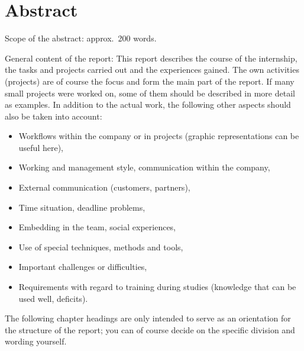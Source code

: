 \documentclass[type=internship,theme=default,language=english,titlelanguage=english,smartquotes=true,aiusage=detailed]{hgbthesis}
\begin{document}
\begin{aiusage}
\end{aiusage}

\frontmatter                                   %

\maketitle
\tableofcontents


\chapter{Abstract}

Scope of the abstract: approx.\ 200 words.

General content of the report: This report describes the course of the
internship, the tasks and projects carried out and the experiences gained. The
own activities (projects) are of course the focus and form the main part of the
report. If many small projects were worked on, some of them should be described
in more detail as examples. In addition to the actual work, the following other
aspects should also be taken into account:
%
\begin{itemize}
	\item Workflows within the company or in projects (graphic representations
	can be useful here),
	\item Working and management style, communication within the company,
	\item External communication (customers, partners),
	\item Time situation, deadline problems,
	\item Embedding in the team, social experiences,
	\item Use of special techniques, methods and tools,
	\item Important challenges or difficulties,
	\item Requirements with regard to training during studies (knowledge that
	can be used well, deficits).
\end{itemize}
%
The following chapter headings are only intended to serve as an orientation for
the structure of the report; you can of course decide on the specific division
and wording yourself.
\end{document}
